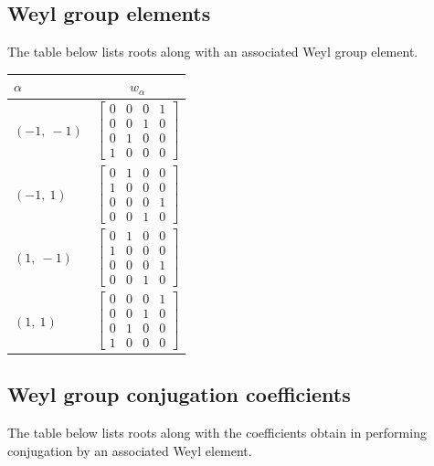 \documentclass[11pt]{article}
\newcommand{\noi}{\noindent}
\theoremstyle{definition}
\begin{document}
\subsection{Weyl group elements}

\noi The table below lists roots along with an associated Weyl group element.

\bigskip

\noi \noindent \begin{longtable}{|l|c|}
    \hline
    $\alpha$ & $w_\alpha$ \\
    \hline
    \endhead
    $\left( -1, \  -1\right)$ & ${\left[\begin{matrix}0 & 0 & 0 & 1\\0 & 0 & 1 & 0\\0 & 1 & 0 & 0\\1 & 0 & 0 & 0\end{matrix}\right]}$ \\
    \hline
    $\left( -1, \  1\right)$ & ${\left[\begin{matrix}0 & 1 & 0 & 0\\1 & 0 & 0 & 0\\0 & 0 & 0 & 1\\0 & 0 & 1 & 0\end{matrix}\right]}$ \\
    \hline
    $\left( 1, \  -1\right)$ & ${\left[\begin{matrix}0 & 1 & 0 & 0\\1 & 0 & 0 & 0\\0 & 0 & 0 & 1\\0 & 0 & 1 & 0\end{matrix}\right]}$ \\
    \hline
    $\left( 1, \  1\right)$ & ${\left[\begin{matrix}0 & 0 & 0 & 1\\0 & 0 & 1 & 0\\0 & 1 & 0 & 0\\1 & 0 & 0 & 0\end{matrix}\right]}$ \\
    \hline
\end{longtable}


\subsection{Weyl group conjugation coefficients}

The table below lists roots along with the coefficients obtain in performing conjugation by an associated Weyl element.
\end{document}
